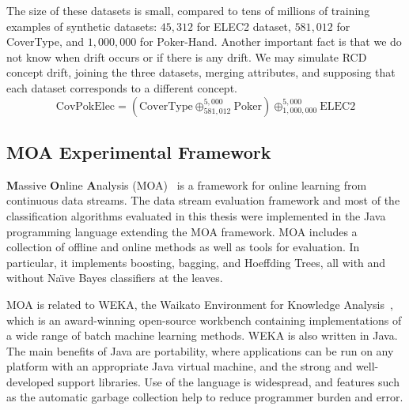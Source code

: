 The size of these datasets is small, compared to tens of millions of training examples of synthetic datasets: $45,312$ for ELEC2 dataset, $581,012$ for CoverType, and $1,000,000$ for Poker-Hand.
Another important fact is that we do not know when drift occurs or if there is any drift. We may simulate RCD concept drift, joining the three datasets, merging attributes, and supposing that each dataset corresponds to a different concept.
$$ \textrm{CovPokElec} =  (\textrm{CoverType} \oplus^{5,000}_{581,012} \textrm{Poker}) \oplus^{5,000}_{1,000,000} \textrm{ELEC2} $$ 

\BEGINOMIT
\subsection{MOA Experimental Framework}
\label{ssec:moa}
{\bf M}assive {\bf O}nline {\bf A}nalysis (MOA)~\cite{MOA} is a
framework for online learning from continuous %
data streams.
The data stream evaluation framework and most of the classification algorithms evaluated in this thesis
were implemented in the Java programming language extending the MOA framework.
MOA includes a collection of offline and online methods as well as tools for evaluation. 
In particular, it implements boosting, bagging, and Hoeffding Trees, all %
with and without Na{\"\i}ve Bayes classifiers at the leaves. 


MOA is related to WEKA, the Waikato
Environment for Knowledge Analysis~\cite{weka}, which is an award-winning open-source 
workbench containing implementations of a wide range of batch machine 
learning methods. WEKA is also written in Java. The main benefits
of Java are portability, where applications can be run on any platform with
an appropriate Java virtual machine, and the strong and well-developed support 
libraries. Use of the language is widespread, and features such as the
automatic garbage collection help to reduce programmer burden and error.

